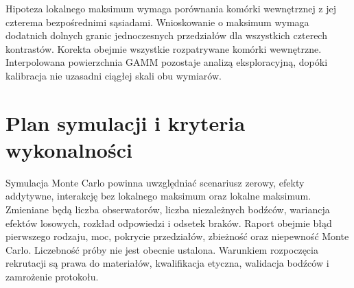 Hipoteza lokalnego maksimum wymaga porównania komórki wewnętrznej z jej czterema bezpośrednimi sąsiadami. Wnioskowanie o maksimum wymaga dodatnich dolnych granic jednoczesnych przedziałów dla wszystkich czterech kontrastów. Korekta obejmie wszystkie rozpatrywane komórki wewnętrzne. Interpolowana powierzchnia GAMM pozostaje analizą eksploracyjną, dopóki kalibracja nie uzasadni ciągłej skali obu wymiarów.

\section{Plan symulacji i kryteria wykonalności}
Symulacja Monte Carlo powinna uwzględniać scenariusz zerowy, efekty addytywne, interakcję bez lokalnego maksimum oraz lokalne maksimum. Zmieniane będą liczba obserwatorów, liczba niezależnych bodźców, wariancja efektów losowych, rozkład odpowiedzi i odsetek braków. Raport obejmie błąd pierwszego rodzaju, moc, pokrycie przedziałów, zbieżność oraz niepewność Monte Carlo. Liczebność próby nie jest obecnie ustalona. Warunkiem rozpoczęcia rekrutacji są prawa do materiałów, kwalifikacja etyczna, walidacja bodźców i zamrożenie protokołu.
